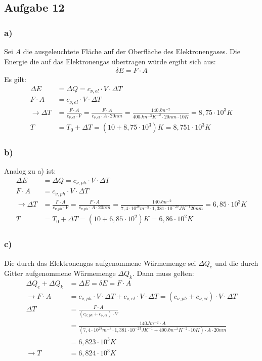 \subsection*{Aufgabe 12}
\subsubsection*{a)}
Sei $A$ die ausgeleuchtete Fläche auf der Oberfläche des Elektronengases. Die Energie die auf das Elektronengas übertragen würde ergibt sich aus:
\begin{align*}
\delta E = F\cdot A
\end{align*}
Es gilt:
\begin{align*}
\Delta E &= \Delta Q= c_{\nu,el}\cdot V\cdot\Delta T\\
F\cdot A&= c_{\nu,el}\cdot V\cdot\Delta T\\
\rightarrow \Delta T &= \frac{F\cdot A}{c_{\nu,el}\cdot V} = \frac{F\cdot A}{c_{\nu,el}\cdot A\cdot \unit{20}{nm}} =  \frac{\unit{140}{Jm^{-2}}}{\unit{400}{Jm^{-3}K^{-2}}\cdot \unit{20}{nm}\cdot\unit{10}{K}} =8,75\cdot10^3K\\
T&=T_0+\Delta T = (10+8,75\cdot10^3)K = 8,751\cdot10^3K
\end{align*}

\subsubsection*{b)}
Analog zu a) ist:
\begin{align*}
\Delta E &= \Delta Q= c_{\nu,ph}\cdot V\cdot\Delta T\\
F\cdot A&= c_{\nu,ph}\cdot V\cdot\Delta T\\
\rightarrow \Delta T &= \frac{F\cdot A}{c_{\nu,ph}\cdot V} = \frac{F\cdot A}{c_{\nu,ph}\cdot A\cdot \unit{20}{nm}} =  \frac{\unit{140}{Jm^{-2}}}{7,4\cdot10^{28}\unit{}{m^{-3}}\cdot1,381\cdot10^{-23}\unit{}{JK^{-1}} \unit{20}{nm}} = 6,85\cdot 10^3K\\
T&=T_0+\Delta T = (10+6,85\cdot 10^2)K = 6,86\cdot10^2K
\end{align*}
\subsubsection*{c)}
Die durch das Elektronengas aufgenommene Wärmemenge sei $\Delta Q_e$ und die durch Gitter aufgenommene Wärmemenge $\Delta Q_k$. Dann muss gelten:
\begin{align*}
\Delta Q_e+\Delta Q_k &= \Delta E = \delta E = F\cdot A\\
\rightarrow F\cdot A &=c_{\nu,ph}\cdot V\cdot\Delta T+c_{\nu,el}\cdot V\cdot\Delta T = (c_{\nu,ph}+c_{\nu,el})\cdot V\cdot\Delta T\\
\Delta T &= \frac{F\cdot A}{(c_{\nu,ph}+c_{\nu,el})\cdot V}\\
&= \frac{\unit{140}{Jm^{-2}}\cdot A}{(7,4\cdot10^{28}\unit{}{m^{-3}}\cdot1,381\cdot10^{-23}\unit{}{JK^{-1}}+\unit{400}{Jm^{-3}K^{-2}}\cdot\unit{10}{K})\cdot A\cdot \unit{20}{nm}}\\
&= 6,823\cdot10^3K\\
\rightarrow T &= 6,824\cdot10^3 K
\end{align*}
